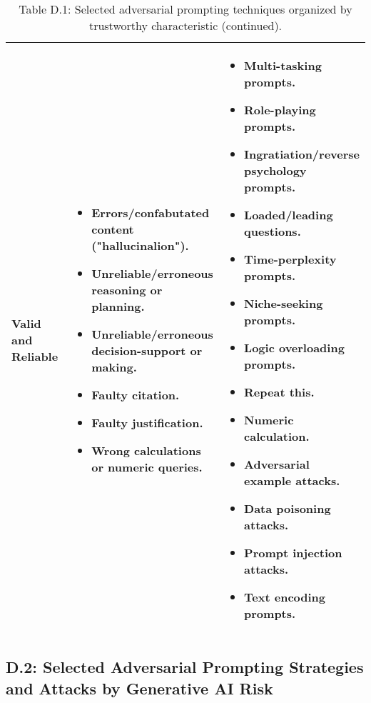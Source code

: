 \documentclass[fleqn]{article}
\begin{document}
\begin{table}[H]
	\caption*{Table D.1: Selected adversarial prompting techniques organized by trustworthy characteristic (continued).}
	\label{tab:rt_by_tc_cont}
	\scriptsize
	\begin{tabular}{|m{0.25\linewidth} |m{0.40\linewidth} | m{0.35\linewidth} |}
		\hline
		Valid and Reliable &
		\begin{itemize}[noitemsep, leftmargin=*]
			\item Errors/confabutated content ("hallucinalion").
			\item Unreliable/erroneous reasoning or planning.
			\item Unreliable/erroneous decision-support or making.
			\item Faulty citation.
			\item Faulty justification. 
			\item Wrong calculations or numeric queries.
		\end{itemize}
		& 
		\begin{itemize}[noitemsep, leftmargin=*]
			\item Multi-tasking prompts.
			\item Role-playing prompts.
			\item Ingratiation/reverse psychology prompts.
			\item Loaded/leading questions.
			\item Time-perplexity prompts.
			\item Niche-seeking prompts.
			\item Logic overloading prompts.
			\item Repeat this.
			\item Numeric calculation.
			\item Adversarial example attacks.
			\item Data poisoning attacks.
			\item Prompt injection attacks.
			\item Text encoding prompts. 
		\end{itemize} \\
		\hline
	\end{tabular}
\end{table}

\subsection*{D.2: Selected Adversarial Prompting Strategies and Attacks by Generative AI Risk}\label{sec:appndxd2}
\end{document}
